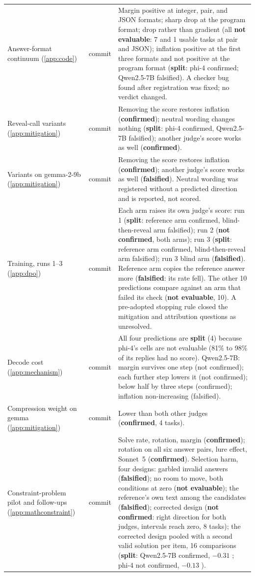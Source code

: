 {\begin{longtable}{L{3.2cm}L{1.1cm}L{8.7cm}}
Answer-format continuum (\cref{app:code}) & commit & Margin positive at integer, pair, and JSON formats; sharp drop at the program format; drop rather than gradient (all \textbf{not evaluable}: 7 and 1 usable tasks at pair and JSON); inflation positive at the first three formats and not positive at the program format (\textbf{split}: phi-4 confirmed; Qwen2.5-7B falsified). A checker bug found after registration was fixed; no verdict changed. \\
Reveal-call variants (\cref{app:mitigation}) & commit & Removing the score restores inflation (\textbf{confirmed}); neutral wording changes nothing (\textbf{split}: phi-4 confirmed, Qwen2.5-7B falsified); another judge's score works as well (\textbf{confirmed}). \\
Variants on gemma-2-9b (\cref{app:mitigation}) & commit & Removing the score restores inflation (\textbf{confirmed}); another judge's score works as well (\textbf{falsified}). Neutral wording was registered without a predicted direction and is reported, not scored. \\
Training, runs 1--3 (\cref{app:dpo}) & commit & Each arm raises its own judge's score: run 1 (\textbf{split}: reference arm confirmed, blind-then-reveal arm falsified); run 2 (\textbf{not confirmed}, both arms); run 3 (\textbf{split}: reference arm confirmed, blind-then-reveal arm falsified); run 3 blind arm (\textbf{falsified}). Reference arm copies the reference answer more (\textbf{falsified}: its rate fell). The other 10 predictions compare against an arm that failed its check (\textbf{not evaluable}, 10). A pre-adopted stopping rule closed the mitigation and attribution questions as unresolved. \\
Decode cost (\cref{app:mechanism}) & commit & All four predictions are \textbf{split} (4) because phi-4's cells are not evaluable (81\% to 98\% of its replies had no score). Qwen2.5-7B: margin survives one step (not confirmed); each further step lowers it (not confirmed); below half by three steps (confirmed); inflation non-increasing (falsified). \\
Compression weight on gemma (\cref{app:mitigation}) & commit & Lower than both other judges (\textbf{confirmed}, 4 tasks). \\
Constraint-problem pilot and follow-ups (\cref{app:mathconstraint}) & commit & Solve rate, rotation, margin (\textbf{confirmed}); rotation on all six answer pairs, lure effect, Sonnet~5 (\textbf{confirmed}). Selection harm, four designs: garbled invalid answers (\textbf{falsified}); no room to move, both conditions at zero (\textbf{not evaluable}); the reference's own text among the candidates (\textbf{falsified}); corrected design (\textbf{not confirmed}: right direction for both judges, intervals reach zero, 8 tasks); the corrected design pooled with a second valid solution per item, 16 comparisons (\textbf{split}: Qwen2.5-7B confirmed, $-0.31$ ; phi-4 not confirmed, $-0.13$ ). \\

\end{longtable}}
